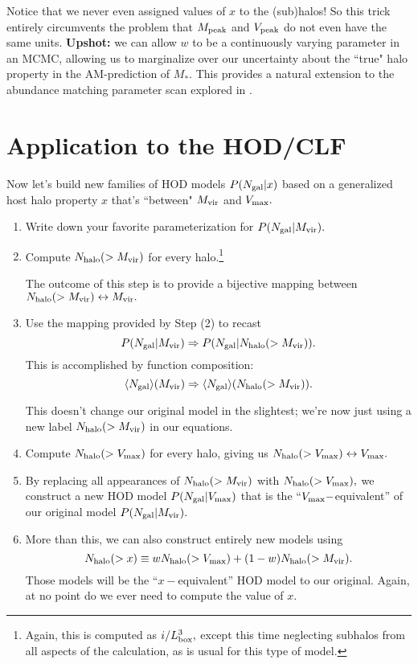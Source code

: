 \documentclass[usenatbib,usegraphicx,letterpaper]{mn2e}
\newcommand{\vmax}{V_{\rm max}}
\newcommand{\mvir}{M_{\rm vir}}
\newcommand{\mpeak}{M_{\rm peak}}
\newcommand{\vpeak}{V_{\rm peak}}
\newcommand{\ben}{\begin{enumerate}}
\newcommand{\een}{\end{enumerate}}
\newcommand{\Ngal}{N_{\rm gal}}
\newcommand{\Nhalo}{N_{\rm halo}}
\newcommand{\mstar}{M_{\ast}}
\begin{document}
Notice that we never even assigned values of $x$ to the (sub)halos! So this trick entirely circumvents the problem that $\mpeak$ and $\vpeak$ do not even have the same units. {\bf Upshot:} we can allow $w$ to be a continuously varying parameter in an MCMC, allowing us to  marginalize over our uncertainty about the ``true" halo property in the AM-prediction of $\mstar.$ This provides a natural extension to the abundance matching parameter scan explored in \citet{reddick_etal12}. 


\section{Application to the HOD/CLF}
\label{sec:hodclf}

Now let's build new families of HOD models $P(\Ngal|x)$ based on a generalized host halo property $x$ that's ``between" $\mvir$ and $\vmax.$ 

\ben
\item Write down your favorite parameterization for $P(\Ngal | \mvir).$
\item Compute $\Nhalo(>\mvir)$ for every halo.\footnote{Again, this is computed as $i/L_{\rm box}^{3},$ except this time neglecting subhalos from all aspects of the calculation, as is usual for this type of model.} 

The outcome of this step is to provide a bijective mapping between $\Nhalo(>\mvir)\leftrightarrow\mvir.$ 
\item Use the mapping provided by Step (2) to recast $$P(\Ngal | \mvir)\Rightarrow P(\Ngal |\Nhalo(>\mvir)).$$
This is accomplished by function composition: $$\langle\Ngal\rangle(\mvir)\Rightarrow\langle\Ngal\rangle(\Nhalo(>\mvir)).$$

This doesn't change our original model in the slightest; we're now just using a new label $\Nhalo(>\mvir)$ in our equations.
\item Compute $\Nhalo(>\vmax)$ for every halo, giving us $\Nhalo(>\vmax)\leftrightarrow\vmax.$ 
\item By replacing all appearances of $\Nhalo(>\mvir)$ with $\Nhalo(>\vmax),$ 
we construct a new HOD model $P(\Ngal|\vmax)$ that is the ``$\vmax-$equivalent'' of our original model $P(\Ngal | \mvir).$
\item More than this, we can also construct entirely new models using $$\Nhalo(>x) \equiv w\Nhalo(>\vmax) + (1-w)\Nhalo(>\mvir).$$ 
Those models will be the ``$x-$equivalent'' HOD model to our original. Again, at no point do we ever need to compute the value of $x.$
\een
\end{document}
